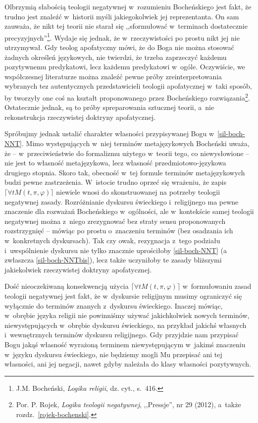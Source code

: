 Olbrzymią słabością teologii negatywnej w~rozumieniu Bocheńskiego jest fakt, że trudno jest znaleźć w~historii myśli jakiegokolwiek jej reprezentanta. On sam zauważa, że nikt tej teorii nie starał się ,,sformułować w~terminach dostatecznie precyzyjnych''\footnote{J.M. Bocheński, \textit{Logika religii}, dz. cyt., s.~416.}. Wydaje się jednak, że w~rzeczywistości po prostu nikt jej nie utrzymywał. Gdy teolog apofatyczny mówi, że do Boga nie można stosować żadnych określeń językowych, nie twierdzi, że trzeba zaprzeczyć każdemu pozytywnemu predykatowi, lecz każdemu predykatowi w~ogóle. Oczywiście, we współczesnej literaturze można znaleźć pewne próby zreinterpretowania wybranych tez autentycznych przedstawicieli teologii apofatycznej w~taki sposób, by tworzyły one coś na kształt proponowanego przez Bocheńskiego rozwiązania\footnote{Por. P. Rojek, \textit{Logika teologii negatywnej}, ,,Pressje'', nr 29 (2012), a~także rozdz.~\ref{rojek-bochenski}.}. Ostatecznie jednak, są to próby spreparowania sztucznej teorii, a~nie rekonstrukcja rzeczywistej doktryny apofatycznej.

Spróbujmy jednak ustalić charakter własności przypisywanej Bogu w~\ref{sil-boch-NNT}. Mimo występujących w~niej terminów metajęzykowych Bocheński uważa, że -- w~przeciwieństwie do formalizmu użytego w~teorii tego, co niewysłowione -- nie jest to własność metajęzykowa, lecz własność przedmiotowo-językowa drugiego stopnia. Skoro tak, obecność w~tej formule terminów metajęzykowych budzi pewne zastrzeżenia. W~istocie trudno oprzeć się wrażeniu, że zapis $\lceil \forall t M(t,\pi,\varphi) \rceil$  niewiele wnosi do skonstruowanej na potrzeby teologii negatywnej zasady. Rozróżnianie dyskursu świeckiego i~religijnego ma pewne znaczenie dla rozważań Bocheńskiego w~ogólności, ale w~kontekście samej teologii negatywnej można z~niego zrezygnować bez straty sensu proponowanych rozstrzygnięć -- mówiąc po prostu o~znaczeniu terminów (bez osadzania ich w~konkretnych dyskursach). Tak czy owak, rezygnacja z~tego podziału i~uwspólnienie dyskursu nie tylko znacznie uprościłoby \ref{sil-boch-NNT} (a zwłaszcza \ref{sil-boch-NNTbis}), lecz także uczyniłoby te zasady bliższymi jakiekolwiek rzeczywistej doktryny apofatycznej.

Dość nieoczekiwaną konsekwencją użycia $\lceil \forall t M(t,\pi,\varphi) \rceil$ w~formułowaniu zasad teologii negatywnej jest fakt, że w~dyskursie religijnym musimy ograniczyć się wyłącznie do terminów znanych z~dyskursu świeckiego. Inaczej mówiąc, w~obrębie języka religii nie powinniśmy używać jakichkolwiek nowych terminów, niewystępujących w~obrębie dyskursu świeckiego, na przykład jakichś własnych i~wewnętrznych terminów dyskursu religijnego. Gdy przyjdzie nam przypisać Bogu jakąś własność wyrażoną terminem niewystępującym w~jakimś znaczeniu w~języku dyskursu świeckiego, nie będziemy mogli Mu przepisać ani tej własności, ani jej negacji, nawet gdyby należała do klasy własności pozytywnych.

